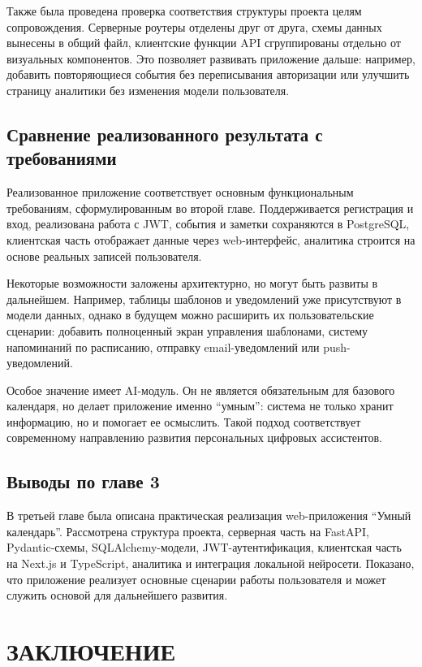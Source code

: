 \documentclass[14pt,a4paper]{extreport}
\begin{document}
Также была проведена проверка соответствия структуры проекта целям сопровождения. Серверные роутеры отделены друг от друга, схемы данных вынесены в общий файл, клиентские функции API сгруппированы отдельно от визуальных компонентов. Это позволяет развивать приложение дальше: например, добавить повторяющиеся события без переписывания авторизации или улучшить страницу аналитики без изменения модели пользователя.

\section{Сравнение реализованного результата с требованиями}

Реализованное приложение соответствует основным функциональным требованиям, сформулированным во второй главе. Поддерживается регистрация и вход, реализована работа с JWT, события и заметки сохраняются в PostgreSQL, клиентская часть отображает данные через web-интерфейс, аналитика строится на основе реальных записей пользователя.

Некоторые возможности заложены архитектурно, но могут быть развиты в дальнейшем. Например, таблицы шаблонов и уведомлений уже присутствуют в модели данных, однако в будущем можно расширить их пользовательские сценарии: добавить полноценный экран управления шаблонами, систему напоминаний по расписанию, отправку email-уведомлений или push-уведомлений.

Особое значение имеет AI-модуль. Он не является обязательным для базового календаря, но делает приложение именно ``умным'': система не только хранит информацию, но и помогает ее осмыслить. Такой подход соответствует современному направлению развития персональных цифровых ассистентов.

\section{Выводы по главе 3}

В третьей главе была описана практическая реализация web-приложения ``Умный календарь''. Рассмотрена структура проекта, серверная часть на FastAPI, Pydantic-схемы, SQLAlchemy-модели, JWT-аутентификация, клиентская часть на Next.js и TypeScript, аналитика и интеграция локальной нейросети. Показано, что приложение реализует основные сценарии работы пользователя и может служить основой для дальнейшего развития.

\chapter*{ЗАКЛЮЧЕНИЕ}
\end{document}
